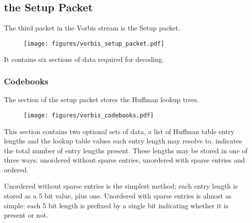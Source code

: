 \subsection{the Setup Packet}

The third packet in the Vorbis stream is the Setup packet.

\begin{figure}[h]
\texttt{[image: figures/vorbis\_setup\_packet.pdf]}
\end{figure}

It contains six sections of data required for decoding.

\clearpage

\subsubsection{Codebooks}

The  section of the setup packet stores
the Huffman lookup trees.

\begin{figure}[h]
\texttt{[image: figures/vorbis\_codebooks.pdf]}
\end{figure}
\par
\noindent
This section contains two optional sets of data,
a list of Huffman table entry lengths
and the lookup table values each entry length may resolve to.
 indicates the total number of entry lengths present.
These lengths may be stored in one of three ways:
unordered without sparse entries, unordered with sparse entries
and ordered.

Unordered without sparse entries is the simplest method;
each entry length is stored as a 5 bit value, plus one.
Unordered with sparse entries is almost as simple;
each 5 bit length is prefixed by a single bit indicating
whether it is present or not.

